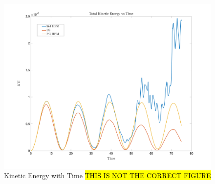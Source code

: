 \begin{figure}[htbp]
	\centering
	\includegraphics[width=5.0in]{figs/KEvT}
	\caption{Kinetic Energy with Time \hl{THIS IS NOT THE CORRECT FIGURE}}
	\label{fig:stdKE}
\end{figure}














































